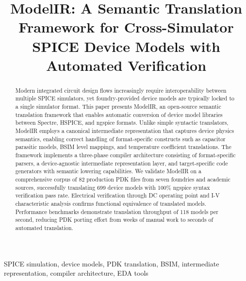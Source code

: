\documentclass[conference]{IEEEtran}
\begin{document}
\title{ModelIR: A Semantic Translation Framework for Cross-Simulator SPICE Device Models with Automated Verification}

\author{
}

\maketitle

\begin{abstract}
Modern integrated circuit design flows increasingly require interoperability between multiple SPICE simulators, yet foundry-provided device models are typically locked to a single simulator format. This paper presents ModelIR, an open-source semantic translation framework that enables automatic conversion of device model libraries between Spectre, HSPICE, and ngspice formats. Unlike simple syntactic translators, ModelIR employs a canonical intermediate representation that captures device physics semantics, enabling correct handling of format-specific constructs such as capacitor parasitic models, BSIM level mappings, and temperature coefficient translations. The framework implements a three-phase compiler architecture consisting of format-specific parsers, a device-agnostic intermediate representation layer, and target-specific code generators with semantic lowering capabilities. We validate ModelIR on a comprehensive corpus of 82 production PDK files from seven foundries and academic sources, successfully translating 699 device models with 100\% ngspice syntax verification pass rate. Electrical verification through DC operating point and I-V characteristic analysis confirms functional equivalence of translated models. Performance benchmarks demonstrate translation throughput of 118 models per second, reducing PDK porting effort from weeks of manual work to seconds of automated translation.
\end{abstract}

\begin{IEEEkeywords}
SPICE simulation, device models, PDK translation, BSIM, intermediate representation, compiler architecture, EDA tools
\end{IEEEkeywords}

\end{document}
